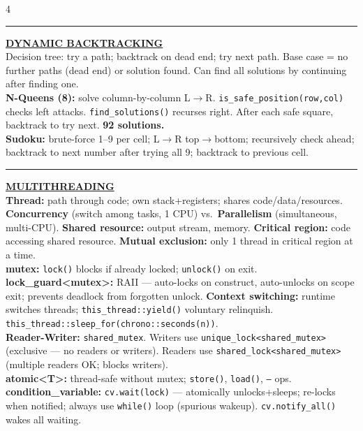 \documentclass[landscape,letterpaper]{article}
\newcommand{\h}[1]{\textbf{#1}}
\newcommand{\hd}[1]{\vspace{1pt}\noindent\textbf{\underline{#1}}\vspace{-1pt}}
\begin{document}
\begin{multicols}{4}
\vspace{-1pt}\noindent\rule{\columnwidth}{0.2pt}\vspace{-3pt}

\hd{DYNAMIC BACKTRACKING}\\[-2pt]
Decision tree: try a path; backtrack on dead end; try next path. Base case = no further paths (dead end) or solution found. Can find all solutions by continuing after finding one.\\[-2pt]
\h{N-Queens (8):} solve column-by-column L$\to$R. \texttt{is\_safe\_position(row,col)} checks left attacks. \texttt{find\_solutions()} recurses right. After each safe square, backtrack to try next. \h{92 solutions.}\\[-2pt]
\h{Sudoku:} brute-force 1--9 per cell; L$\to$R top$\to$bottom; recursively check ahead; backtrack to next number after trying all 9; backtrack to previous cell.\\[-2pt]

\vspace{-1pt}\noindent\rule{\columnwidth}{0.2pt}\vspace{-3pt}

\hd{MULTITHREADING}\\[-2pt]
\h{Thread:} path through code; own stack+registers; shares code/data/resources. \h{Concurrency} (switch among tasks, 1 CPU) vs.\ \h{Parallelism} (simultaneous, multi-CPU). \h{Shared resource:} output stream, memory. \h{Critical region:} code accessing shared resource. \h{Mutual exclusion:} only 1 thread in critical region at a time.\\[-2pt]
\h{mutex:} \texttt{lock()} blocks if already locked; \texttt{unlock()} on exit. \h{lock\_guard\textless mutex\textgreater:} RAII — auto-locks on construct, auto-unlocks on scope exit; prevents deadlock from forgotten unlock. \h{Context switching:} runtime switches threads; \texttt{this\_thread::yield()} voluntary relinquish. \texttt{this\_thread::sleep\_for(chrono::seconds(n))}.\\[-2pt]
\h{Reader-Writer:} \texttt{shared\_mutex}. Writers use \texttt{unique\_lock\textless shared\_mutex\textgreater} (exclusive — no readers or writers). Readers use \texttt{shared\_lock\textless shared\_mutex\textgreater} (multiple readers OK; blocks writers).\\[-2pt]
\h{atomic\textless T\textgreater:} thread-safe without mutex; \texttt{store()}, \texttt{load()}, \texttt{--} ops.\\[-2pt]
\h{condition\_variable:} \texttt{cv.wait(lock)} — atomically unlocks+sleeps; re-locks when notified; always use \texttt{while()} loop (spurious wakeup). \texttt{cv.notify\_all()} wakes all waiting.\\[-2pt]


\end{multicols}
\end{document}
